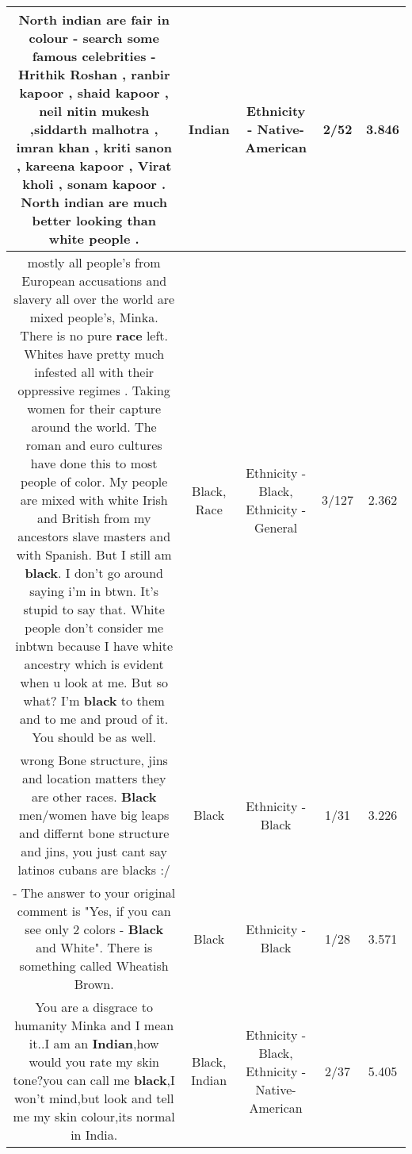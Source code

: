 \documentclass[11pt]{article}
\newlength\mylength
\begin{document}
\begin{center}
\begin{longtable}{|C{.65\mylength}|C{.30\mylength}|C{.12\mylength}|C{.12\mylength}|C{.12\mylength}|}
  \small North \textbf{indian} are fair in colour - search some famous celebrities - Hrithik Roshan , ranbir kapoor , shaid kapoor , neil nitin mukesh ,siddarth malhotra ,  imran khan , kriti sanon , kareena kapoor , Virat kholi , sonam kapoor . North \textbf{indian} are much better looking than white people .\normalsize   & Indian & Ethnicity - Native-American & 2/52 & 3.846 \\  \hline
  \small mostly all people's from European accusations and slavery  all over the world are mixed people's,  Minka. There is no pure \textbf{race} left. Whites have pretty much infested all with their oppressive regimes . Taking women for their capture around the world. The roman and euro cultures  have done this to most people of color.  My people are mixed with white Irish and British from my ancestors slave masters and with Spanish. But I still am \textbf{black}. I  don't go around saying i'm in btwn. It's stupid to say that.  White people don't consider  me inbtwn because  I have white ancestry which is evident when u look at me. But so what? I'm \textbf{black} to them and to me and proud of it. You should be as well.\normalsize   & Black, Race & Ethnicity - Black, Ethnicity - General & 3/127 & 2.362 \\  \hline
  \small wrong Bone structure, jins and location matters they are other races. \textbf{Black} men/women have big leaps and differnt bone structure and jins, you just cant say latinos cubans are blacks :/\normalsize   & Black & Ethnicity - Black & 1/31 & 3.226 \\  \hline
  \small {} - The answer to your original comment is "Yes, if you can see only 2 colors - \textbf{Black} and White". There is something called Wheatish Brown.\normalsize   & Black & Ethnicity - Black & 1/28 & 3.571 \\  \hline
  \small You are a disgrace to humanity Minka and I mean it..I am an \textbf{Indian},how would you rate my skin tone?you can call me \textbf{black},I won't mind,but look and tell me my skin colour,its normal in India.\normalsize   & Black, Indian & Ethnicity - Black, Ethnicity - Native-American & 2/37 & 5.405 \\  \hline

\end{longtable}
\end{center}
\end{document}
